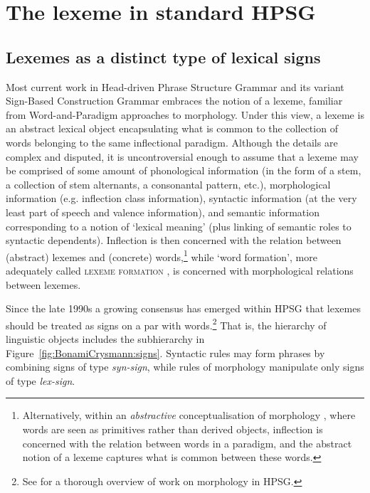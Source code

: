\documentclass[output=paper]{langsci/langscibook}
\begin{document}
\section{The lexeme in standard HPSG}
\label{sec:1}

\subsection{Lexemes as a distinct type of lexical signs}

Most current work in Head-driven Phrase Structure Grammar
\citep[henceforth HPSG;][]{Pollard94,Ginzburg00,Sag03} and its variant
Sign-Based Construction Grammar \citep[henceforth SBCG;][]{Boas12}
embraces the notion of a lexeme, familiar from Word-and-Paradigm
approaches to morphology. Under this view, a lexeme is an abstract
lexical object encapsulating what is common to the collection of words
belonging to the same inflectional paradigm. Although the details are
complex and disputed, it is uncontroversial enough to assume that a lexeme
may be comprised of some amount of phonological information (in the
form of a stem, a collection of stem alternants, a consonantal
pattern, etc.), morphological information (e.g. inflection class
information), syntactic information (at the very least part of speech
and valence information), and semantic information corresponding to a
notion of `lexical meaning' (plus linking of semantic roles to
syntactic dependents). Inflection is then concerned with the relation
between (abstract) lexemes and (concrete)
words,\footnote{Alternatively, within an \emph{abstractive}
  conceptualisation of morphology \citep{Blevins06}, where words are
  seen as primitives rather than derived objects, inflection is
  concerned with the relation between words in a paradigm, and the
  abstract notion of a lexeme captures what is common between these
  words.} while `word formation', more adequately called
\textsc{lexeme formation} \citep{Aronoff94}, is concerned with
morphological relations between lexemes.

Since the late 1990s a growing consensus has emerged within HPSG that
lexemes should be treated as signs on a par with words.\footnote{See \citet{Bonami15b} for a thorough overview of work on morphology in HPSG.} That is, the 
hierarchy of linguistic objects includes the subhierarchy in
Figure~\ref{fig:BonamiCrysmann:signs}. Syntactic rules may form phrases by combining
signs of type \emph{syn-sign}, while rules of morphology manipulate
only signs of type \emph{lex-sign}.
\end{document}
